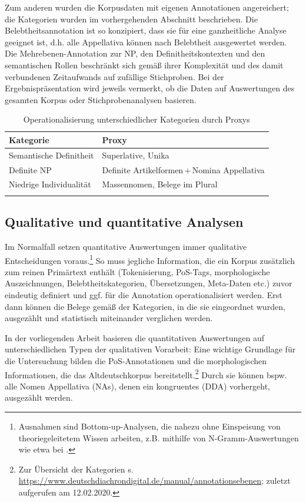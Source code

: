 Zum anderen wurden die Korpusdaten mit eigenen Annotationen angereichert; die Kategorien wurden im vorhergehenden Abschnitt beschrieben. Die Belebtheitsannotation ist so konzipiert, dass sie für eine ganzheitliche Analyse geeignet ist, d.h. alle Appellativa können nach Belebtheit ausgewertet werden. Die Mehrebenen-Annotation zur NP, den Definitheitskontexten und den semantischen Rollen beschränkt sich gemäß ihrer Komplexität und des damit verbundenen Zeitaufwands auf zufällige Stichproben. Bei der Ergebnispräsentation wird jeweils vermerkt, ob die Daten auf Auswertungen des gesamten Korpus oder Stichprobenanalysen basieren. 

\begin{table}
\centering
\begin{tabular}{ll}
\lsptoprule
Kategorie     & Proxy            \\ \midrule
Semantische Definitheit & Superlative, Unika            \\
Definite NP             & Definite Artikelformen\,+\,Nomina Appellativa        \\
Niedrige Individualität & Massennomen, Belege im Plural \\ \lspbottomrule
\end{tabular}
\caption{Operationalisierung unterschiedlicher Kategorien durch Proxys\label{tab:proxys}}
\end{table}
 
\subsection{Qualitative und quantitative Analysen}\label{sec:qual-quant}

Im Normalfall setzen quantitative Auswertungen immer qualitative Entscheidungen voraus.\footnote{Ausnahmen sind Bottom-up-Analysen, die nahezu ohne Einspeisung von theoriegeleitetem Wissen arbeiten, z.B. mithilfe von N-Gramm-Auswertungen wie etwa bei \textcite{Scharloth2012}.} So muss jegliche Information, die ein Korpus zusätzlich zum reinen Primärtext enthält (Tokenisierung, PoS-Tags, morphologische Auszeichnungen, Belebtheitskategorien, Übersetzungen, Meta-Daten etc.) zuvor eindeutig definiert und ggf. für die Annotation operationalisiert werden. Erst dann können die Belege gemäß der Kategorien, in die sie eingeordnet wurden, ausgezählt und statistisch miteinander verglichen werden.   

In der vorliegenden Arbeit basieren die quantitativen Auswertungen auf unterschiedlichen Typen der qualitativen Vorarbeit:
Eine wichtige Grundlage für die Untersuchung bilden die PoS-Annotationen und die morphologischen Informationen, die das Altdeutschkorpus bereitstellt.\footnote{Zur Übersicht der Kategorien s. \url{https://www.deutschdiachrondigital.de/manual/annotationsebenen}; zuletzt aufgerufen am 12.02.2020.} Durch sie können bspw. alle Nomen Appellativa (NAs), denen ein kongruentes  (DDA) vorhergeht, ausgezählt werden.

